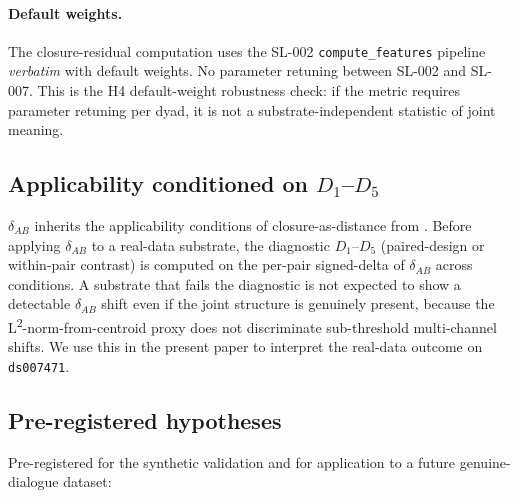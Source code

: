 \documentclass[11pt,a4paper]{article}
\begin{document}
\paragraph{Default weights.} The closure-residual computation uses the SL-002 \texttt{compute\_features} pipeline \emph{verbatim} with default weights. No parameter retuning between SL-002 and SL-007. This is the H4 default-weight robustness check: if the metric requires parameter retuning per dyad, it is not a substrate-independent statistic of joint meaning.

\subsection{Applicability conditioned on $D_1$--$D_5$}\label{sec:methods-diagnostic}

$\delta_{AB}$ inherits the applicability conditions of closure-as-distance from \citep{SmartClosureDistance}. Before applying $\delta_{AB}$ to a real-data substrate, the diagnostic $D_1$--$D_5$ (paired-design or within-pair contrast) is computed on the per-pair signed-delta of $\delta_{AB}$ across conditions. A substrate that fails the diagnostic is not expected to show a detectable $\delta_{AB}$ shift even if the joint structure is genuinely present, because the L\textsuperscript{2}-norm-from-centroid proxy does not discriminate sub-threshold multi-channel shifts. We use this in the present paper to interpret the real-data outcome on \texttt{ds007471}.

\subsection{Pre-registered hypotheses}\label{sec:methods-prereg}

Pre-registered for the synthetic validation and for application to a future genuine-dialogue dataset:
\end{document}

